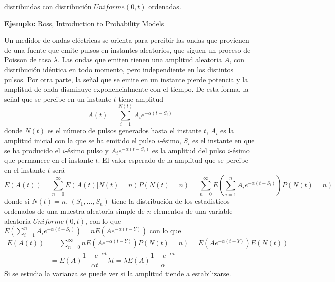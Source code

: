 distribuidas con distribuci\'{o}n $Uniforme(0,t)$ ordenadas.
\par
{\bf Ejemplo:} Ross, Introduction to Probability Models
\par
Un medidor de ondas el\'{e}ctricas se orienta para percibir las ondas
que provienen de una fuente que emite pulsos en instantes
aleatorios, que siguen un proceso de Poisson de tasa $\lambda$.
Las ondas que emiten tienen una amplitud aleatoria $A$, con
distribuci\'{o}n id\'{e}ntica en todo momento, pero independiente en los
distintos pulsos. Por otra parte, la se\~{n}al que se emite en un
instante pierde potencia y la amplitud de onda disminuye
exponencialmente con el tiempo. De esta forma, la se\~{n}al que se
percibe en un instante $t$ tiene amplitud
\[
A(t)=\displaystyle\sum_{i=1}^{N(t)} A_i e^{-\alpha(t-S_i)}
\]
donde $N(t)$ es el n\'{u}mero de pulsos generados hasta el instante
$t$, $A_i$ es la amplitud inicial con la que se ha emitido el
pulso $i$-\'{e}simo, $S_i$ es el instante en que se ha producido el
$i$-\'{e}simo pulso y $A_i e^{-\alpha(t-S_i)}$ es la amplitud del
pulso $i$-\'{e}simo que permanece en el instante $t$. El valor
esperado de la amplitud que se percibe en el instante $t$ ser\'{a}
\[
E(A(t))=\displaystyle\sum_{n=0}^{\infty} E(A(t)|N(t)=n)P(N(t)=n)=
\displaystyle\sum_{n=0}^{\infty} E\left
(\displaystyle\sum_{i=1}^{n}A_i e^{-\alpha(t-S_i)}\right
)P(N(t)=n)
\]
donde si $N(t)=n$, $(S_1,\ldots,S_n)$ tiene la distribuci\'{o}n de los
estad\'{\i}sticos ordenados de una muestra aleatoria simple de $n$
elementos de una variable aleatoria $Uniforme(0,t)$, con lo que
$E\left (\displaystyle\sum_{i=1}^{n}A_i
e^{-\alpha(t-S_i)}\right)=n E(A e^{-\alpha(t-Y)})$ con lo que
\[
\begin{array}{ll}
E(A(t))&=\displaystyle\sum_{n=0}^{\infty} nE(A
e^{-\alpha(t-Y)})P(N(t)=n)= E(A
e^{-\alpha(t-Y)})E(N(t))=\\
&=E(A)\dfrac{1-e^{-\alpha t}}{\alpha t}\lambda t=\lambda
E(A)\dfrac{1-e^{-\alpha t}}{\alpha}
\end{array}
\]
Si se estudia la varianza se puede ver si la amplitud tiende a
estabilizarse.
